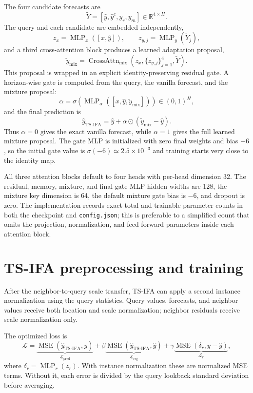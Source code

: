 \documentclass[11pt]{article}
\newcommand{\method}[1]{\texttt{#1}}
\begin{document}
The four candidate forecasts are
\[
  \widetilde Y=[\hat y,\hat y^c,y_r,y_m]\in\mathbb{R}^{4\times H}.
\]
The query and each candidate are embedded independently,
\[
  z_x=\operatorname{MLP}_x([x,\hat y]),\qquad
  z_{y,j}=\operatorname{MLP}_y(\widetilde Y_j),
\]
and a third cross-attention block produces a learned adaptation proposal,
\[
  \tilde y_{\mathrm{mix}}
  =\operatorname{CrossAttn}_{\mathrm{mix}}(z_x,\{z_{y,j}\}_{j=1}^{4},\widetilde Y).
\]
This proposal is wrapped in an explicit identity-preserving residual gate.  A
horizon-wise gate is computed from the query, the vanilla forecast, and the
mixture proposal:
\[
  \alpha
  =\sigma\!\left(\operatorname{MLP}_{\alpha}([x,\hat y,\tilde y_{\mathrm{mix}}])\right)
  \in (0,1)^H,
\]
and the final prediction is
\[
  \hat y_{\mathrm{TS\mbox{-}IFA}}
  =\hat y+\alpha\odot(\tilde y_{\mathrm{mix}}-\hat y).
\]
Thus $\alpha=0$ gives the exact vanilla forecast, while $\alpha=1$ gives the
full learned mixture proposal.  The gate MLP is initialized with zero final
weights and bias $-6$, so the initial gate value is
$\sigma(-6)\simeq 2.5\times 10^{-3}$ and training starts very close to the
identity map.

All three attention blocks default to four heads with per-head dimension 32.
The residual, memory, mixture, and final gate MLP hidden widths are 128, the
mixture key dimension is 64, the default mixture gate bias is $-6$, and dropout
is zero.  The implementation records exact total and trainable parameter counts
in both the checkpoint and
\method{config.json}; this is preferable to a simplified count that omits the
projection, normalization, and feed-forward parameters inside each attention
block.

\section{TS-IFA preprocessing and training}

After the neighbor-to-query scale transfer, TS-IFA can apply a second instance
normalization using the query statistics.  Query values, forecasts, and
neighbor values receive both location and scale normalization; neighbor
residuals receive scale normalization only.

The optimized loss is
\[
  \mathcal L
  =\underbrace{\operatorname{MSE}(\hat y_{\mathrm{TS\mbox{-}IFA}},y)}_{\mathcal L_{\mathrm{pred}}}
  +\beta\underbrace{\operatorname{MSE}(\hat y_{\mathrm{TS\mbox{-}IFA}},\hat y)}_{\mathcal L_{\mathrm{reg}}}
  +\gamma\underbrace{\operatorname{MSE}(\delta_r,y-\hat y)}_{\mathcal L_r},
\]
where $\delta_r=\operatorname{MLP}_r(z_r)$.  With instance normalization these
are normalized MSE terms.  Without it, each error is divided by the query
lookback standard deviation before averaging.
\end{document}
